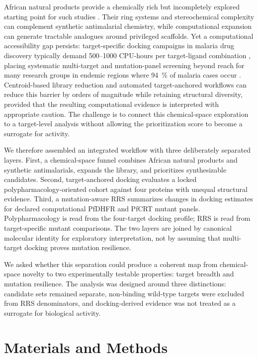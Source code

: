 \documentclass[journal=jcisd8,manuscript=article]{achemso}
\begin{document}
African natural products provide a chemically rich but incompletely explored starting point for such studies \cite{Newman2007,NtieKang2018,Simoben2023,Cheuka2020}. Their ring systems and stereochemical complexity can complement synthetic antimalarial chemistry, while computational expansion can generate tractable analogues around privileged scaffolds. Yet a computational accessibility gap persists: target-specific docking campaigns in malaria drug discovery typically demand \numrange{500}{1000} CPU-hours per target-ligand combination \cite{Trott2009,Eberhardt2021}, placing systematic multi-target and mutation-panel screening beyond reach for many research groups in endemic regions where \qty{94}{\percent} of malaria cases occur \cite{WHO2024MalariaReport}. Centroid-based library reduction and automated target-anchored workflows can reduce this barrier by orders of magnitude while retaining structural diversity, provided that the resulting computational evidence is interpreted with appropriate caution. The challenge is to connect this chemical-space exploration to a target-level analysis without allowing the prioritization score to become a surrogate for activity.

We therefore assembled an integrated workflow with three deliberately separated layers. First, a chemical-space funnel combines African natural products and synthetic antimalarials, expands the library, and prioritizes synthesizable candidates. Second, target-anchored docking evaluates a locked polypharmacology-oriented cohort against four proteins with unequal structural evidence. Third, a mutation-aware RRS summarizes changes in docking estimates for declared computational PfDHFR and PfCRT mutant panels. Polypharmacology is read from the four-target docking profile; RRS is read from target-specific mutant comparisons. The two layers are joined by canonical molecular identity for exploratory interpretation, not by assuming that multi-target docking proves mutation resilience.

We asked whether this separation could produce a coherent map from chemical-space novelty to two experimentally testable properties: target breadth and mutation resilience. The analysis was designed around three distinctions: candidate sets remained separate, non-binding wild-type targets were excluded from RRS denominators, and docking-derived evidence was not treated as a surrogate for biological activity.

\section{Materials and Methods}
\end{document}
